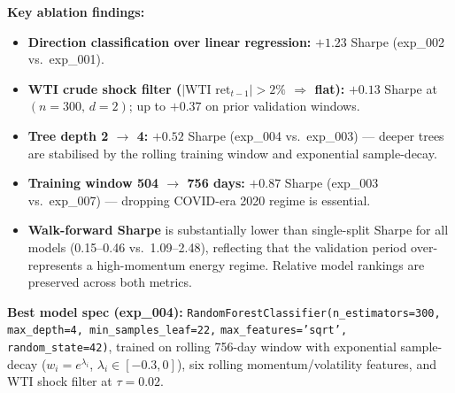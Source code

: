 \documentclass[11pt]{article}
\begin{document}
\bigskip
\noindent\textbf{Key ablation findings:}
\begin{itemize}\setlength\itemsep{2pt}
  \item \textbf{Direction classification over linear regression:} $+1.23$ Sharpe
        (exp\_002 vs.\ exp\_001).
  \item \textbf{WTI crude shock filter ($|\text{WTI ret}_{t-1}| > 2\%$ $\Rightarrow$ flat):}
        $+0.13$ Sharpe at $(n{=}300,\, d{=}2)$; up to $+0.37$ on prior validation windows.
  \item \textbf{Tree depth 2 $\to$ 4:} $+0.52$ Sharpe (exp\_004 vs.\ exp\_003) — deeper trees
        are stabilised by the rolling training window and exponential sample-decay.
  \item \textbf{Training window 504 $\to$ 756 days:} $+0.87$ Sharpe (exp\_003 vs.\ exp\_007)
        — dropping COVID-era 2020 regime is essential.
  \item \textbf{Walk-forward Sharpe} is substantially lower than single-split Sharpe for all
        models (0.15--0.46 vs.\ 1.09--2.48), reflecting that the validation period over-represents
        a high-momentum energy regime. Relative model rankings are preserved across both metrics.
\end{itemize}

\bigskip
\noindent\textbf{Best model spec (exp\_004):}
\texttt{RandomForestClassifier(n\_estimators=300, max\_depth=4, min\_samples\_leaf=22,}
\texttt{max\_features='sqrt', random\_state=42)}, trained on rolling 756-day window with
exponential sample-decay ($w_i = e^{\lambda_i}$, $\lambda_i \in [-0.3, 0]$), six rolling
momentum/volatility features, and WTI shock filter at $\tau=0.02$.
\end{document}
